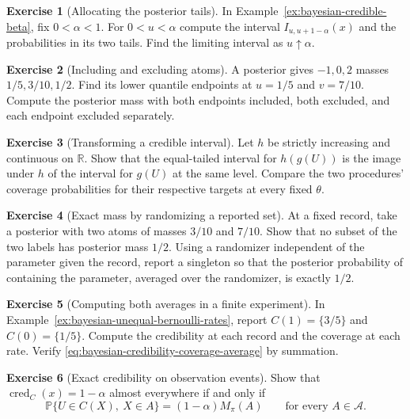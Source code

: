 \documentclass[11pt,oneside]{book}
\theoremstyle{definition}
\newtheorem{exercise}{Exercise}[section]
\theoremstyle{remark}
\newcommand{\R}{\mathbb R}
\begin{document}
\begin{exercise}[Allocating the posterior tails]
\label{exer:bayesian-credible-tail-allocation}
In Example~\ref{ex:bayesian-credible-beta}, fix $0<\alpha<1$.
For $0<u<\alpha$ compute the interval $I_{u,u+1-\alpha}(x)$
and the probabilities in its two tails. Find the limiting
interval as $u\uparrow\alpha$.
\end{exercise}

\begin{exercise}[Including and excluding atoms]
\label{exer:bayesian-credible-interval-endpoints}
A posterior gives $-1,0,2$ masses $1/5,3/10,1/2$.
Find its lower quantile endpoints at $u=1/5$ and $v=7/10$.
Compute the posterior mass with both endpoints included,
both excluded, and each endpoint excluded separately.
\end{exercise}

\begin{exercise}[Transforming a credible interval]
\label{exer:bayesian-credible-transform}
Let $h$ be strictly increasing and continuous on $\R$.
Show that the equal-tailed interval for $h(g(U))$ is the
image under $h$ of the interval for $g(U)$ at the same level.
Compare the two procedures' coverage probabilities for their
respective targets at every fixed $\theta$.
\end{exercise}

\begin{exercise}[Exact mass by randomizing a reported set]
\label{exer:bayesian-credible-randomization}
At a fixed record, take a posterior with two atoms of masses
$3/10$ and $7/10$. Show that no subset of the two labels has
posterior mass $1/2$. Using a randomizer independent of the
parameter given the record, report a singleton so that the
posterior probability of containing the parameter, averaged
over the randomizer, is exactly $1/2$.
\end{exercise}

\begin{exercise}[Computing both averages in a finite experiment]
\label{exer:bayesian-credible-finite-averages}
In Example~\ref{ex:bayesian-unequal-bernoulli-rates}, report
$C(1)=\{3/5\}$ and $C(0)=\{1/5\}$. Compute the credibility at
each record and the coverage at each rate. Verify
\eqref{eq:bayesian-credibility-coverage-average} by summation.
\end{exercise}

\begin{exercise}[Exact credibility on observation events]
\label{exer:bayesian-credible-record-events}
Show that $\operatorname{cred}_C(x)=1-\alpha$ almost everywhere
if and only if
\[
\mathbb P\{U\in C(X),\ X\in A\}=(1-\alpha)M_\pi(A)
\qquad\text{for every } A\in\mathcal A.
\]
\end{exercise}
\end{document}
